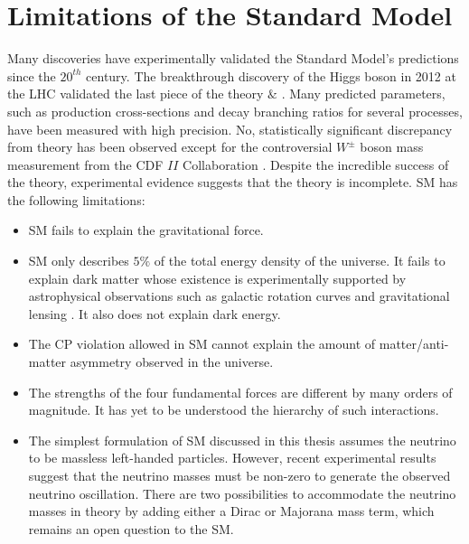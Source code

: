 \section{Limitations of the Standard Model} 
\label{sec:SM_Incomplete}

Many discoveries have experimentally validated the Standard Model's predictions since the $20^{th}$ century. The breakthrough discovery of the Higgs boson in 2012 at the LHC validated the last piece of the theory \cite{CMSHiggsDiscovery}$\&$ \cite{ATLASHiggsDiscovery}. Many predicted parameters, such as production cross-sections and decay branching ratios for several processes, have been measured with high precision. No, statistically significant discrepancy from theory has been observed except for the controversial $W^{\pm}$ boson mass measurement from the CDF $II$ Collaboration \cite{CDFWMass}. Despite the incredible success of the theory, experimental evidence suggests that the theory is incomplete. SM has the following limitations:

\begin{itemize}

\item{SM fails to explain the gravitational force.}

\item{SM only describes $5\%$ of the total energy density of the universe. It fails to explain dark matter whose existence is experimentally supported by astrophysical observations such as galactic rotation curves and gravitational lensing \cite{DMGravitationalLensing}. It also does not explain dark energy. }

\item{The CP violation allowed in SM cannot explain the amount of matter/anti-matter asymmetry observed in the universe. }

\item{ The strengths of the four fundamental forces are different by many orders of magnitude. It has yet to be understood the hierarchy of such interactions.}

\item{ The simplest formulation of SM discussed in this thesis assumes the neutrino to be massless left-handed particles. However, recent experimental results suggest that the neutrino masses must be non-zero to generate the observed neutrino oscillation\cite{NeutrinoOscillation}. There are two possibilities to accommodate the neutrino masses in theory by adding either a Dirac or Majorana mass term, which remains an open question to the SM. } 

\end{itemize}
 
